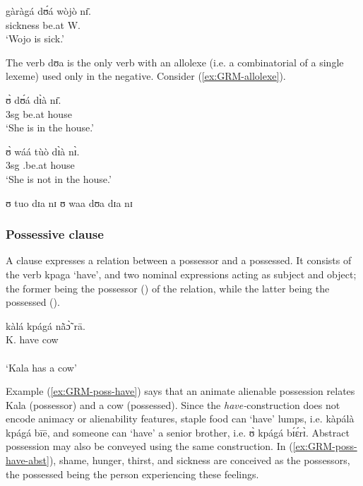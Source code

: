 \ea\label{ex:GRM-loc-propascr}
\gll gàràgá dʊ́á wòjò nɪ̄.\\
sickness be.at W. {\postp}\\
\glt  `Wojo is sick.'
\z

 The verb {\sls dʊa} is the only verb with an allolexe (i.e. a combinatorial 
 of a single lexeme) used only in the 
negative. Consider (\ref{ex:GRM-allolexe}).

\ea\label{ex:GRM-allolexe}

\ea\label{ex:GRM-allolexe-pos}
\gll ʊ̀  dʊ́á dɪ̀à nɪ̄.\\
{\sc 3sg} be.at house {\postp}\\
\glt  `She is in the house.'

\ex\label{ex:GRM-allolexe-neg}
\gll ʊ̀  wáá tùò dɪ̀à nɪ̀.\\
{\sc 3sg} {\neg} {\neg}.be.at house {\postp}\\
\glt  `She is not in the house.'


\ex\label{ex:GRM-allolexe-pos-out}
 \textasteriskcentered ʊ  tuo dɪa nɪ
\ex\label{ex:GRM-allolexe-neg-out}
 \textasteriskcentered ʊ  waa dʊa dɪa nɪ

\z 
 \z



\subsubsection{Possessive clause}
\label{sec:GRM-poss-cl}

A  clause expresses a relation between  a
possessor and a possessed.   It consists of
the verb {\sls kpaga} `have',  and two nominal expressions acting as subject and
object; the former being the possessor (\psor) of the relation, while  the
latter being  the possessed
(\psed).

\ea\label{ex:GRM-poss-have}
\glll kàlá kpágá nã̀ɔ̃̀ rā.\\
K. have cow {\foc}\\
  {\psor} {}   {\psed} {}\\
\glt  `Kala has a cow'
\z

Example (\ref{ex:GRM-poss-have}) says that an animate alienable possession
relates  Kala (possessor) and a cow (possessed).  Since the  {\it
have-}construction does not encode animacy or alienability features,   staple
food can `have' lumps, i.e. {\sls kàpálà kpágá bīē}, and someone can `have' a
senior brother, i.e. {\sls ʊ̀ kpágá bɪ́ɛ́rɪ̀}.  Abstract possession may also be
conveyed using the same construction. In (\ref{ex:GRM-poss-have-abst}),
  shame, hunger,  thirst, and sickness are conceived as the possessors, the
possessed being the person experiencing these feelings. 



